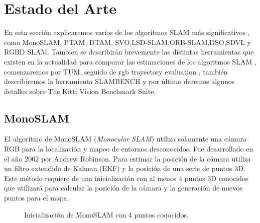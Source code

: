 \section{Estado del Arte} \label{s:estado}

En esta sección explicaremos varios de los algoritmos SLAM más significativos , como MonoSLAM, PTAM, DTAM, SVO,LSD-SLAM,ORB-SLAM,DSO,SDVL y RGBD SLAM.
Tambien se describirán brevemente las distintas herramientas que existen en la actualidad para comparar las estimaciones de los algoritmos SLAM , comenzaremos por TUM, seguido de rgb trayectory evaluation , también describiremos la herramienta SLAMBENCH y por último daremos algunos detalles sobre The Kitti Vision Benchmark Suite.


\subsection{MonoSLAM}
El algoritmo de  MonoSLAM (\textit{Monocular SLAM}) \cite{Davison2007monoslam} utiliza solamente una cámara RGB para la localización y mapeo de entornos desconocidos. Fue desarrollado en el año 2002  por Andrew Robinson. Para estimar la posición de la cámara utiliza un filtro extendido de Kalman (EKF) y la posición de una serie de puntos 3D. Este método requiere de una inicialización con al menos 4 puntos 3D conocidos que utilizará para calcular la posición de la cámara y la generación de nuevos puntos para el mapa.
\begin{figure}[H]
\begin{center}
\end{center}
\caption{Inicialización de MonoSLAM con 4 puntos conocidos.}
\end{figure}

